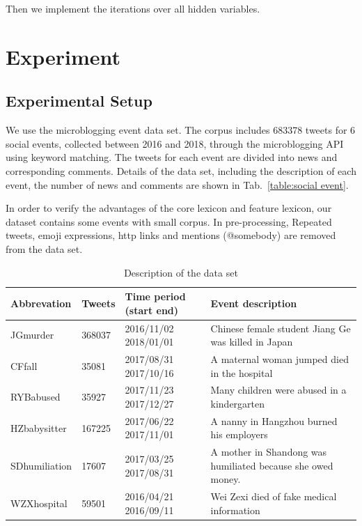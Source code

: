\documentclass[runningheads]{llncs}
\begin{document}
Then we implement the iterations over all hidden variables.
\section{Experiment}\label{sec:Experiment}
\subsection{Experimental Setup}
We use the microblogging event data set. The corpus includes 683378 tweets for 6 social events, collected between 2016 and 2018, through the microblogging API using keyword matching. The tweets for each event are divided into news and corresponding comments. Details of the data set, including the description of each event, the number of news and comments are shown in Tab.~\ref{table:social event}.

In order to verify the advantages of the core lexicon and feature lexicon, our dataset contains some events with small corpus. In pre-processing, Repeated tweets, emoji expressions, http links and mentions (@somebody) are removed from the data set.
\begin{table}[ht]
\caption{Description of the data set}\label{table:social event}
\begin{center}
\tiny
\begin{tabular}{|l|l|l|l|}
\hline
Abbrevation   & Tweets & Time period (start end) & Event description                                           \\ \hline
JGmurder      & 368037 & 2016/11/02 2018/01/01   & Chinese female student Jiang Ge was killed in Japan         \\ \hline
CFfall        & 35081  & 2017/08/31 2017/10/16   & A maternal woman jumped died in the hospital                \\ \hline
RYBabused     & 35927  & 2017/11/23 2017/12/27   & Many children were abused in a kindergarten                 \\ \hline
HZbabysitter  & 167225 & 2017/06/22 2017/11/01   & A nanny in Hangzhou burned his employers                    \\ \hline
SDhumiliation & 17607  & 2017/03/25 2017/08/31   & A mother in Shandong was humiliated because she owed money. \\ \hline
WZXhospital   & 59501  & 2016/04/21 2016/09/11   & Wei Zexi died of fake medical information                   \\ \hline
\end{tabular}
\end{center}
\label{default}
\end{table}
\end{document}
